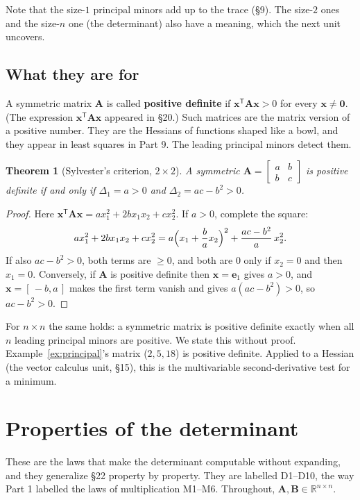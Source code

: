 \documentclass[11pt]{article}
\theoremstyle{plain}
\newtheorem{thm}{Theorem}[section]
\theoremstyle{definition}
\theoremstyle{remark}
\newcommand{\R}{\mathbb{R}}
\newcommand{\vc}[1]{\mathbf{#1}}
\newcommand{\mt}[1]{\mathbf{#1}}
\newcommand{\T}{^{\mathsf{T}}}
\begin{document}
\noindent Note that the size-$1$ principal minors add up to the trace (\S9). The
size-$2$ ones and the size-$n$ one (the determinant) also have a meaning, which
the next unit uncovers.

\subsection{What they are for}
A symmetric matrix $\mt{A}$ is called \textbf{positive definite} if
$\vc{x}\T\mt{A}\vc{x}>0$ for every $\vc{x}\neq\vc{0}$. (The expression
$\vc{x}\T\mt{A}\vc{x}$ appeared in \S20.) Such matrices are the matrix version of
a positive number. They are the Hessians of functions shaped like a bowl, and
they appear in least squares in Part 9. The leading principal minors detect them.

\begin{thm}[Sylvester's criterion, $2\times2$]
A symmetric $\mt{A}=\begin{bmatrix}a&b\\b&c\end{bmatrix}$ is positive definite if
and only if $\Delta_1=a>0$ and $\Delta_2=ac-b^{2}>0$.
\end{thm}

\begin{proof}
Here $\vc{x}\T\mt{A}\vc{x}=ax_1^{2}+2bx_1x_2+cx_2^{2}$. If $a>0$, complete the
square:
\[
  ax_1^{2}+2bx_1x_2+cx_2^{2}
  =a\Bigl(x_1+\frac{b}{a}x_2\Bigr)^{2}+\frac{ac-b^{2}}{a}\,x_2^{2}.
\]
If also $ac-b^{2}>0$, both terms are $\ge0$, and both are $0$ only if $x_2=0$ and
then $x_1=0$. Conversely, if $\mt{A}$ is positive definite then $\vc{x}=\vc{e}_1$
gives $a>0$, and $\vc{x}=[\,-b,a\,]$ makes the first term vanish and gives
$a(ac-b^{2})>0$, so $ac-b^{2}>0$.
\end{proof}

\noindent For $n\times n$ the same holds: a symmetric matrix is positive
definite exactly when all $n$ leading principal minors are positive. We state this
without proof. Example~\ref{ex:principal}'s matrix ($2,5,18$) is positive
definite. Applied to a Hessian (the vector calculus unit, \S15), this is the
multivariable second-derivative test for a minimum.

\section{Properties of the determinant}
These are the laws that make the determinant computable without expanding, and
they generalize \S22 property by property. They are labelled D1--D10, the way
Part 1 labelled the laws of multiplication M1--M6. Throughout,
$\mt{A},\mt{B}\in\R^{n\times n}$.
\end{document}
